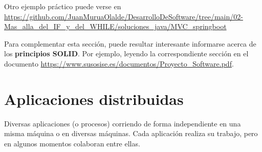 \documentclass[spanish,12pt,a4paper,final,oneside]{book}
\begin{document}
\begin{footnotesize}
Otro ejemplo práctico puede verse en \\ \url{https://github.com/JuanMuruaOlalde/DesarrolloDeSoftware/tree/main/02-Mas_alla_del_IF_y_del_WHILE/soluciones_java/MVC_springboot}
\end{footnotesize}

\begin{footnotesize}
Para complementar esta sección, puede resultar interesante informarse acerca de los \textbf{principios SOLID}. Por ejemplo, leyendo la correspondiente sección en el documento \url{https://www.susosise.es/documentos/Proyecto_Software.pdf}.
\end{footnotesize}


\section{Aplicaciones distribuidas} \label{AplicacionesDistribuidas}
Diversas aplicaciones (o procesos) corriendo de forma independiente en una misma máquina o en diversas máquinas. Cada aplicación realiza su trabajo, pero en algunos momentos colaboran entre ellas.
\end{document}
